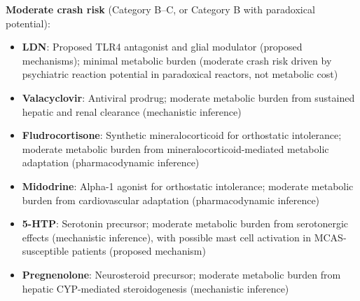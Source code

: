 \textbf{Moderate crash risk} (Category B--C, or Category B with paradoxical potential):
\begin{itemize}
    \item \textbf{LDN}: Proposed TLR4 antagonist and glial modulator (proposed mechanisms); minimal metabolic burden (moderate crash risk driven by psychiatric reaction potential in paradoxical reactors, not metabolic cost)
    \item \textbf{Valacyclovir}: Antiviral prodrug; moderate metabolic burden from sustained hepatic and renal clearance (mechanistic inference)
    \item \textbf{Fludrocortisone}: Synthetic mineralocorticoid for orthostatic intolerance; moderate metabolic burden from mineralocorticoid-mediated metabolic adaptation (pharmacodynamic inference)
    \item \textbf{Midodrine}: Alpha-1 agonist for orthostatic intolerance; moderate metabolic burden from cardiovascular adaptation (pharmacodynamic inference)
    \item \textbf{5-HTP}: Serotonin precursor; moderate metabolic burden from serotonergic effects (mechanistic inference), with possible mast cell activation in MCAS-susceptible patients (proposed mechanism)
    \item \textbf{Pregnenolone}: Neurosteroid precursor; moderate metabolic burden from hepatic CYP-mediated steroidogenesis (mechanistic inference)
\end{itemize}

